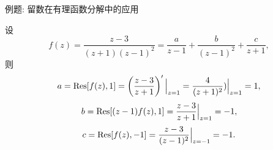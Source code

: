 \begin{frame}{例题: 留数在有理函数分解中的应用}
\onslide<+->
\begin{solution}
设
\[f(z)=\frac{z-3}{(z+1)(z-1)^2}=\frac a{z-1}+\frac b{(z-1)^2}+\frac c{z+1},\]
\onslide<+->
则
\[a={\mathrm{Res}}[f(z),1]=\left(\frac{z-3}{z+1}\right)'\Big|_{z=1}
=\frac 4{(z+1)^2})\Big|_{z=1}=1,\]
\[b={\mathrm{Res}}[(z-1)f(z),1]=\frac{z-3}{z+1}\Big|_{z=1}
=-1,\]
\[c={\mathrm{Res}}[f(z),-1]=\frac{z-3}{(z-1)^2}\Big|_{z=-1}
=-1.\]
\end{solution}
\end{frame}

